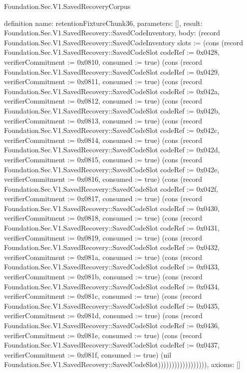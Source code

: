 \begin{lexlean}{Foundation.Sec.V1.SavedRecoveryCorpus}
\begin{semanticmodule}
definition{
  name: retentionFixtureChunk36,
  parameters: [],
  result: Foundation.Sec.V1.SavedRecovery::SavedCodeInventory,
  body: (record Foundation.Sec.V1.SavedRecovery::SavedCodeInventory {slots := (cons (record Foundation.Sec.V1.SavedRecovery::SavedCodeSlot {codeRef := 0x0428, verifierCommitment := 0x0810, consumed := true}) (cons (record Foundation.Sec.V1.SavedRecovery::SavedCodeSlot {codeRef := 0x0429, verifierCommitment := 0x0811, consumed := true}) (cons (record Foundation.Sec.V1.SavedRecovery::SavedCodeSlot {codeRef := 0x042a, verifierCommitment := 0x0812, consumed := true}) (cons (record Foundation.Sec.V1.SavedRecovery::SavedCodeSlot {codeRef := 0x042b, verifierCommitment := 0x0813, consumed := true}) (cons (record Foundation.Sec.V1.SavedRecovery::SavedCodeSlot {codeRef := 0x042c, verifierCommitment := 0x0814, consumed := true}) (cons (record Foundation.Sec.V1.SavedRecovery::SavedCodeSlot {codeRef := 0x042d, verifierCommitment := 0x0815, consumed := true}) (cons (record Foundation.Sec.V1.SavedRecovery::SavedCodeSlot {codeRef := 0x042e, verifierCommitment := 0x0816, consumed := true}) (cons (record Foundation.Sec.V1.SavedRecovery::SavedCodeSlot {codeRef := 0x042f, verifierCommitment := 0x0817, consumed := true}) (cons (record Foundation.Sec.V1.SavedRecovery::SavedCodeSlot {codeRef := 0x0430, verifierCommitment := 0x0818, consumed := true}) (cons (record Foundation.Sec.V1.SavedRecovery::SavedCodeSlot {codeRef := 0x0431, verifierCommitment := 0x0819, consumed := true}) (cons (record Foundation.Sec.V1.SavedRecovery::SavedCodeSlot {codeRef := 0x0432, verifierCommitment := 0x081a, consumed := true}) (cons (record Foundation.Sec.V1.SavedRecovery::SavedCodeSlot {codeRef := 0x0433, verifierCommitment := 0x081b, consumed := true}) (cons (record Foundation.Sec.V1.SavedRecovery::SavedCodeSlot {codeRef := 0x0434, verifierCommitment := 0x081c, consumed := true}) (cons (record Foundation.Sec.V1.SavedRecovery::SavedCodeSlot {codeRef := 0x0435, verifierCommitment := 0x081d, consumed := true}) (cons (record Foundation.Sec.V1.SavedRecovery::SavedCodeSlot {codeRef := 0x0436, verifierCommitment := 0x081e, consumed := true}) (cons (record Foundation.Sec.V1.SavedRecovery::SavedCodeSlot {codeRef := 0x0437, verifierCommitment := 0x081f, consumed := true}) (nil Foundation.Sec.V1.SavedRecovery::SavedCodeSlot)))))))))))))))))}),
  axioms: []
}


\end{semanticmodule}
\end{lexlean}
